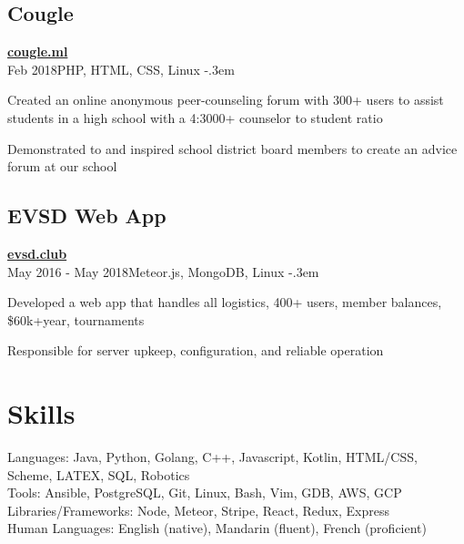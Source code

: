 \documentclass{article}
\let\olditemize=\itemize \let\endolditemize=\enditemize
\renewenvironment{itemize}{\olditemize[topsep=0em] \itemsep-.3em}{\endolditemize}
\newcommand{\link}[1]{\href{https://#1}{#1}}
\newcommand{\entry}[3]{\quad\textbf{#1}\\#2\qquad#3}
\begin{document}
\subsection{Cougle}
\entry{\link{cougle.ml}}{Feb 2018}{PHP, HTML, CSS, Linux}
\begin{itemize}
  \item Created an online anonymous peer-counseling forum with 300+ users to assist
    students in a high school with a 4:3000+ counselor to student ratio
  \item Demonstrated to and inspired school district board members to create an
    advice forum at our school
\end{itemize}

\subsection{EVSD Web App}
\entry{\link{evsd.club}}{May 2016 - May 2018}{Meteor.js, MongoDB, Linux}
\begin{itemize}
  \item Developed a web app that handles all logistics, 400+ users, member balances,
    \$60k+year, tournaments
  \item Responsible for server upkeep, configuration, and reliable operation
\end{itemize}


\section{Skills}
Languages:
  Java, Python, Golang, C++, Javascript, Kotlin, HTML/CSS, Scheme, LATEX, SQL, Robotics \\
Tools:
  Ansible, PostgreSQL, Git, Linux, Bash, Vim, GDB, AWS, GCP \\
Libraries/Frameworks:
  Node, Meteor, Stripe, React, Redux, Express \\
Human Languages:
  English (native), Mandarin (fluent), French (proficient)
\end{document}

